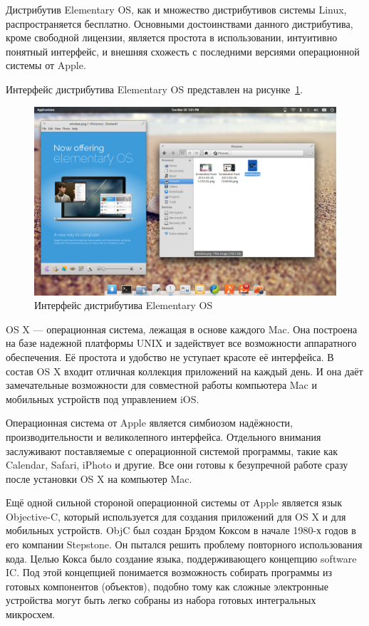Дистрибутив Elementary OS, как и множество дистрибутивов системы Linux,
распространяется бесплатно. Основными достоинствами данного дистрибутива,
кроме свободной лицензии, является простота в использовании,
интуитивно понятный интерфейс, и внешняя схожесть с последними версиями
операционной системы от Apple.

Интерфейс дистрибутива Elementary OS представлен на рисунке~\ref{pic:elementary}.
\begin{figure}[h!]
  \centering
  \includegraphics[width=150mm]{pic/elementary.png}
  \caption{Интерфейс дистрибутива Elementary OS}
  \label{pic:elementary}
\end{figure}

OS X --- операционная система, лежащая в основе каждого Mac. Она построена на
базе надежной платформы UNIX и задействует все возможности аппаратного обеспечения.
Её простота и удобство не уступает красоте её интерфейса. В состав OS X входит
отличная коллекция приложений на каждый день. И она даёт замечательные возможности
для совместной работы компьютера Mac и мобильных устройств под управлением iOS.

Операционная система от Apple является симбиозом надёжности, производительности
и великолепного интерфейса. Отдельного внимания заслуживают поставляемые с
операционной системой программы, такие как Calendar, Safari, iPhoto и другие.
Все они готовы к безупречной работе сразу после установки OS X на компьютер Mac.

Ещё одной сильной стороной операционной системы от Apple является язык Objective-C,
который используется для создания приложений для OS X и для мобильных устройств.
ObjC был создан Брэдом Коксом в начале 1980-х годов в его компании Stepstone.
Он пытался решить проблему повторного использования кода.
Целью Кокса было создание языка, поддерживающего концепцию software IC.
Под этой концепцией понимается возможность собирать программы
из готовых компонентов (объектов), подобно тому как сложные электронные устройства
могут быть легко собраны из набора готовых интегральных микросхем.

